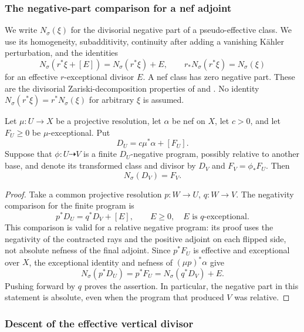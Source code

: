 \subsubsection{The negative-part comparison for a nef adjoint}
We write $N_\sigma(\xi)$ for the divisorial negative part of a
pseudo-effective class. We use its homogeneity, subadditivity,
continuity after adding a vanishing K\"ahler perturbation, and the
identities
\[
 N_\sigma(r^*\xi+[E])=N_\sigma(r^*\xi)+E,
 \qquad r_*N_\sigma(r^*\xi)=N_\sigma(\xi)
\]
for an effective $r$-exceptional divisor $E$. A nef class has zero
negative part. These are the divisorial Zariski-decomposition
properties of \cite[Section~3]{Boucksom2004} and
\cite[Appendix~A]{DHY}. No identity
$N_\sigma(r^*\xi)=r^*N_\sigma(\xi)$ for arbitrary $\xi$ is assumed.

\begin{lemma}
\label{prog:negative-part-program}
Let $\mu:U\to X$ be a projective resolution, let $\alpha$ be nef on $X$,
let $c>0$, and let $F_U\geq0$ be $\mu$-exceptional. Put
\[
 D_U=c\mu^*\alpha+[F_U].
\]
Suppose that $\phi:U\dasharrow V$ is a finite $D_U$-negative program,
possibly relative to another base, and denote its transformed class and
divisor by $D_V$ and $F_V=\phi_*F_U$. Then
\[
                         N_\sigma(D_V)=F_V.
\]
\end{lemma}

\begin{proof}
Take a common projective resolution $p:W\to U$, $q:W\to V$.
The negativity comparison for the finite program is
\[
                p^*D_U=q^*D_V+[E],
 \qquad E\geq0,\quad E\text{ is }q\text{-exceptional}.
\]
This comparison is valid for a relative negative program: its proof
uses the negativity of the contracted rays and the positive adjoint on
each flipped side, not absolute nefness of the final adjoint.
Since $p^*F_U$ is effective and exceptional over $X$, the exceptional
identity and nefness of $(\mu p)^*\alpha$ give
\[
 N_\sigma(p^*D_U)=p^*F_U
                 =N_\sigma(q^*D_V)+E.
\]
Pushing forward by $q$ proves the assertion. In particular, the
negative part in this statement is absolute, even when the program
that produced $V$ was relative.
\end{proof}

\subsubsection{Descent of the effective vertical divisor}

